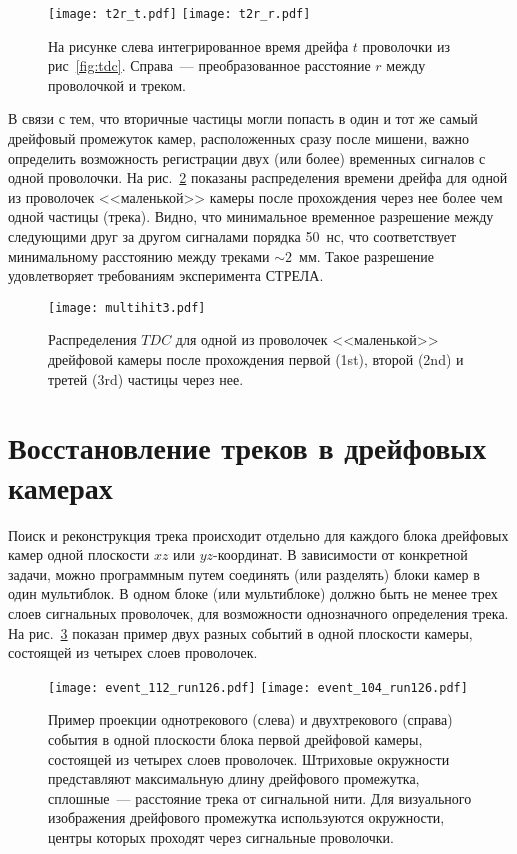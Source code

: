\begin{figure}[h]
  \centering
  \texttt{[image: t2r\_t.pdf]} \hfill
  \texttt{[image: t2r\_r.pdf]}
  \caption{На рисунке слева интегрированное время дрейфа $t$ проволочки из
    рис~\ref{fig:tdc}. Справа~--- преобразованное расстояние $r$ между
    проволочкой и треком.}
  \label{fig:t2r}
\end{figure}

В связи с тем, что вторичные частицы могли попасть в один и тот же самый
дрейфовый промежуток камер, расположенных сразу после мишени, важно
определить возможность регистрации двух (или более) временных сигналов с одной
проволочки. На рис.~\ref{fig:multihit} показаны распределения времени дрейфа для
одной из проволочек <<маленькой>> камеры после прохождения через нее более чем
одной частицы (трека). Видно, что минимальное временное разрешение между
следующими друг за другом сигналами порядка 50~нс, что соответствует
минимальному расстоянию между треками $\sim 2$~мм. Такое разрешение
удовлетворяет требованиям эксперимента СТРЕЛА.

\begin{figure}[h]
  \centering
  \texttt{[image: multihit3.pdf]}
  \caption{Распределения $TDC$ для одной из проволочек <<маленькой>> дрейфовой
    камеры после прохождения первой (1st), второй (2nd) и третей (3rd) частицы
    через нее.}
  \label{fig:multihit}
\end{figure}

\section{Восстановление треков в дрейфовых камерах}
Поиск и реконструкция трека происходит отдельно для каждого блока
дрейфовых камер одной плоскости $xz$ или $yz$-координат. В зависимости от
конкретной задачи, можно программным путем соединять (или разделять) блоки
камер в один мультиблок. В одном блоке (или мультиблоке) должно быть не менее
трех слоев сигнальных проволочек, для возможности однозначного определения
трека. На рис.~\ref{fig:typo_2events} показан пример двух разных событий в одной
плоскости камеры, состоящей из четырех слоев проволочек.

\begin{figure}[h]
  \centering
  \texttt{[image: event\_112\_run126.pdf]} \hfill
  \texttt{[image: event\_104\_run126.pdf]}
  \caption{Пример проекции однотрекового (слева) и двухтрекового (справа)
    события в одной плоскости блока первой дрейфовой камеры, состоящей из
    четырех слоев проволочек. Штриховые окружности представляют максимальную
    длину дрейфового промежутка, сплошные~--- расстояние трека от сигнальной
    нити. Для визуального изображения дрейфового промежутка используются
    окружности, центры которых проходят через сигнальные проволочки.}
  \label{fig:typo_2events}
\end{figure}

